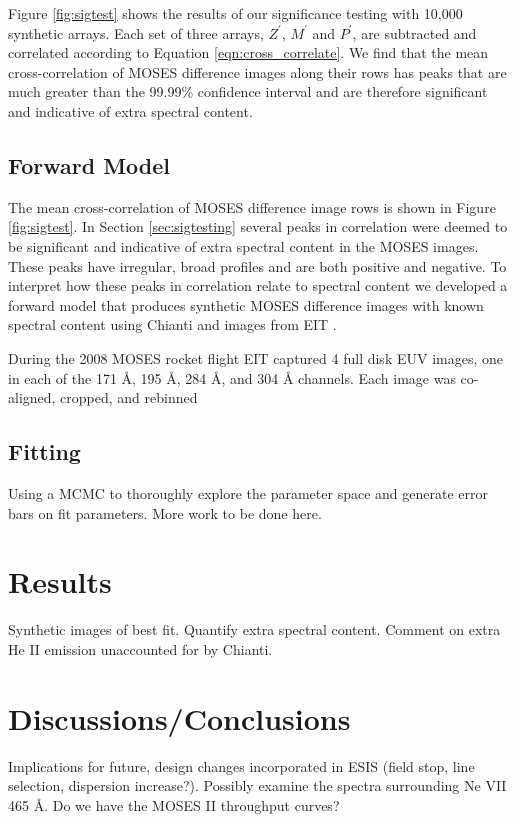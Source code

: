 \documentclass[]{solarphysics}
\begin{document}
\begin{article}
	Figure \ref{fig:sigtest} shows the results of our significance testing with 10,000 synthetic arrays.  Each set of three arrays, $Z^{'}$, $M^{'}$ and $P^{'}$, are subtracted and correlated according to Equation \ref{eqn:cross_correlate}. We find that the mean cross-correlation of MOSES difference images along their rows has peaks that are much greater than the 99.99\% confidence interval and are therefore significant and indicative of extra spectral content.
	
	
	
	
	
	\subsection{Forward Model} 
	The mean cross-correlation of MOSES difference image rows is shown in Figure \ref{fig:sigtest}.  In Section \ref{sec:sigtesting} several peaks in correlation were deemed to be significant and indicative of extra spectral content in the MOSES images.  These peaks have irregular, broad profiles and are both positive and negative.  To interpret how these peaks in correlation relate to spectral content we developed a forward model that produces synthetic MOSES difference images with known spectral content using Chianti \citep{} and images from EIT \citep{}.  
	
	During the 2008 MOSES rocket flight EIT captured 4 full disk EUV images, one in each of the 171 {\AA}, 195 {\AA}, 284 {\AA}, and 304 {\AA} channels.  Each image was co-aligned, cropped, and rebinned 
	
	\subsection{Fitting}
	Using a MCMC to thoroughly explore the parameter space and generate error bars on fit parameters. More work to be done here.

\section{Results}
	Synthetic images of best fit.  Quantify extra spectral content.  Comment on extra He II emission unaccounted for by Chianti. 

\section{Discussions/Conclusions}
	Implications for future, design changes incorporated in ESIS (field stop, line selection, dispersion increase?). Possibly examine the spectra surrounding Ne VII 465 \AA.  Do we have the MOSES II throughput curves? 
	



\end{article}
\end{document}
